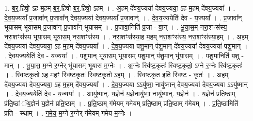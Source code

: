 \documentclass[17pt]{extarticle}
\begin{document}
1. ब॒र्॒.हिषो॒ ऽह म॒हम् ब॒र्॒.हिषो॑ ब॒र्॒.हिषो॒ ऽहम् । . अ॒हम् दे॑वय॒ज्यया॑ देवय॒ज्यया॒ ऽह म॒हम् दे॑वय॒ज्यया᳚ । . दे॒व॒य॒ज्यया᳚ प्र॒जावा᳚न् प्र॒जावा᳚न् देवय॒ज्यया॑ देवय॒ज्यया᳚ प्र॒जावान्॑ । . दे॒व॒य॒ज्ययेति॑ देव - य॒ज्यया᳚ । . प्र॒जावा᳚न् भूयासम् भूयासम् प्र॒जावा᳚न् प्र॒जावा᳚न् भूयासम् । . प्र॒जावा॒निति॑ प्र॒जा - वा॒न् । . भू॒या॒स॒म् नरा॒शꣳस॑स्य॒ नरा॒शꣳस॑स्य भूयासम् भूयास॒म् नरा॒शꣳस॑स्य । . नरा॒शꣳस॑स्या॒ह म॒हम् नरा॒शꣳस॑स्य॒ नरा॒शꣳस॑स्या॒हम् । . अ॒हम् दे॑वय॒ज्यया॑ देवय॒ज्यया॒ ऽह म॒हम् दे॑वय॒ज्यया᳚ । . दे॒व॒य॒ज्यया॑ पशु॒मान् प॑शु॒मान् दे॑वय॒ज्यया॑ देवय॒ज्यया॑ पशु॒मान् । . दे॒व॒य॒ज्ययेति॑ देव - य॒ज्यया᳚ । . प॒शु॒मान् भू॑यासम् भूयासम् पशु॒मान् प॑शु॒मान् भू॑यासम् । . प॒शु॒मानिति॑ पशु - मान् । . भू॒या॒स॒ म॒ग्ने र॒ग्नेर् भू॑यासम् भूयास म॒ग्नेः । . अ॒ग्नेः स्वि॑ष्ट॒कृतः॑ स्विष्ट॒कृतो॒ ऽग्ने र॒ग्नेः स्वि॑ष्ट॒कृतः॑ । . स्वि॒ष्ट॒कृतो॒ ऽह म॒हꣳ स्वि॑ष्ट॒कृतः॑ स्विष्ट॒कृतो॒ ऽहम् । . स्वि॒ष्ट॒कृत॒ इति॑ स्विष्ट - कृतः॑ । . अ॒हम् दे॑वय॒ज्यया॑ देवय॒ज्यया॒ ऽह म॒हम् दे॑वय॒ज्यया᳚ । . दे॒व॒य॒ज्यया ऽऽयु॑ष्मा॒ नायु॑ष्मान् देवय॒ज्यया॑ देवय॒ज्यया ऽऽयु॑ष्मान् । . दे॒व॒य॒ज्ययेति॑ देव - य॒ज्यया᳚ । . आयु॑ष्मान्. य॒ज्ञेन॑ य॒ज्ञेनायु॑ष्मा॒ नायु॑ष्मान्. य॒ज्ञेन॑ । . य॒ज्ञेन॑ प्रति॒ष्ठाम् प्र॑ति॒ष्ठां ॅय॒ज्ञेन॑ य॒ज्ञेन॑ प्रति॒ष्ठाम् । . प्र॒ति॒ष्ठाम् ग॑मेयम् गमेयम् प्रति॒ष्ठाम् प्र॑ति॒ष्ठाम् ग॑मेयम् । . प्र॒ति॒ष्ठामिति॑ प्रति - स्थाम् । . ग॒मे॒य॒ म॒ग्ने र॒ग्नेर् ग॑मेयम् गमेय म॒ग्नेः । \newline
\end{document}
